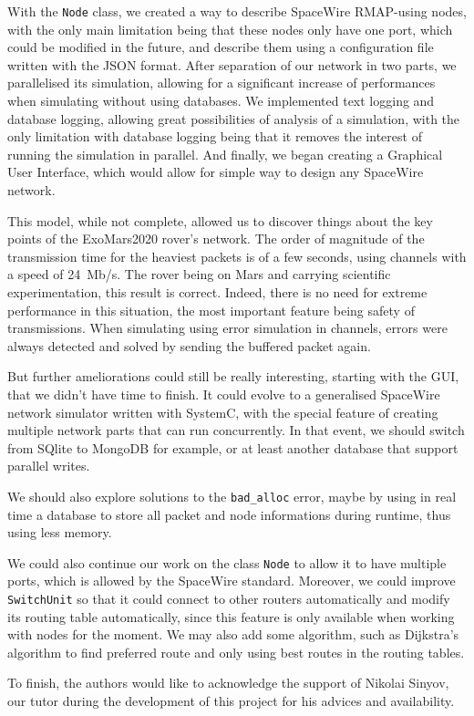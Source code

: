 \documentclass[12pt,a4paper]{article}
\begin{document}
With the \texttt{Node} class, we created a way to describe SpaceWire RMAP-using nodes, with the only main limitation being that these nodes only have one port, which could be modified in the future, and describe them using a configuration file written with the JSON format. After separation of our network in two parts, we parallelised its simulation, allowing for a significant increase of performances when simulating without using databases. We implemented text logging and database logging, allowing great possibilities of analysis of a simulation, with the only limitation with database logging being that it removes the interest of running the simulation in parallel. And finally, we began creating a Graphical User Interface, which would allow for simple way to design any SpaceWire network.\medbreak

This model, while not complete, allowed us to discover things about the key points of the ExoMars2020 rover's network. The order of magnitude of the transmission time for the heaviest packets is of a few seconds, using channels with a speed of \SI{24}{\mega b/\second}. The rover being on Mars and carrying scientific experimentation, this result is correct. Indeed, there is no need for extreme performance in this situation, the most important feature being safety of transmissions. When simulating using error simulation in channels, errors were always detected and solved by sending the buffered packet again.\medbreak

But further ameliorations could still be really interesting, starting with the GUI, that we didn't have time to finish. It could evolve to a generalised SpaceWire network simulator written with SystemC, with the special feature of creating multiple network parts that can run concurrently. In that event, we should switch from SQlite to MongoDB for example, or at least another database that support parallel writes.

We should also explore solutions to the \texttt{bad\_alloc} error, maybe by using in real time a database to store all packet and node informations during runtime, thus using less memory.

We could also continue our work on the class \texttt{Node} to allow it to have multiple ports, which is allowed by the SpaceWire standard. Moreover, we could improve \texttt{SwitchUnit} so that it could connect to other routers automatically and modify its routing table automatically, since this feature is only available when working with nodes for the moment. We may also add some algorithm, such as Dijkstra's algorithm to find preferred route and only using best routes in the routing tables.\bigbreak

To finish, the authors would like to acknowledge the support of Nikolai Sinyov, our tutor during the development of this project for his advices and availability.

\pagebreak
\nocite{*}


\end{document}
